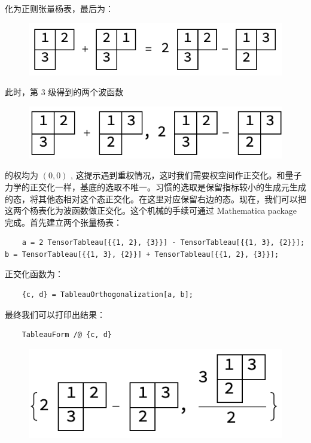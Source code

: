 \documentclass[UTF8]{ctexart}
\begin{document}
\noindent 化为正则张量杨表，最后为：

\begin{figure}[H]
\begin{centering}
\includegraphics[width=0.5\linewidth]{include/Y9}
\par\end{centering}
\end{figure}

\noindent 此时，第 3 级得到的两个波函数

\begin{figure}[H]
\begin{centering}
\includegraphics[width=0.5\linewidth]{include/Y10}
\par\end{centering}
\end{figure}

\noindent 的权均为 $(0,0)$ , 这提示遇到重权情况，这时我们需要权空间作正交化。和量子力学的正交化一样，基底的选取不唯一。习惯的选取是保留指标较小的生成元生成的态，将其他态相对这个态正交化。在这里对应保留右边的态。现在，我们可以把这两个杨表化为波函数做正交化。这个机械的手续可通过 Mathematica package 完成。首先建立两个张量杨表：
\begin{verbatim}
	a = 2 TensorTableau[{{1, 2}, {3}}] - TensorTableau[{{1, 3}, {2}}];
b = TensorTableau[{{1, 3}, {2}}] + TensorTableau[{{1, 2}, {3}}];
\end{verbatim}
正交化函数为：
\begin{verbatim}
	{c, d} = TableauOrthogonalization[a, b];
\end{verbatim}
最终我们可以打印出结果：
\begin{verbatim}
	TableauForm /@ {c, d}
\end{verbatim}

\begin{figure}[H]
\begin{centering}
\includegraphics[width=0.4\linewidth]{include/O4}
\par\end{centering}
\end{figure}
\end{document}
